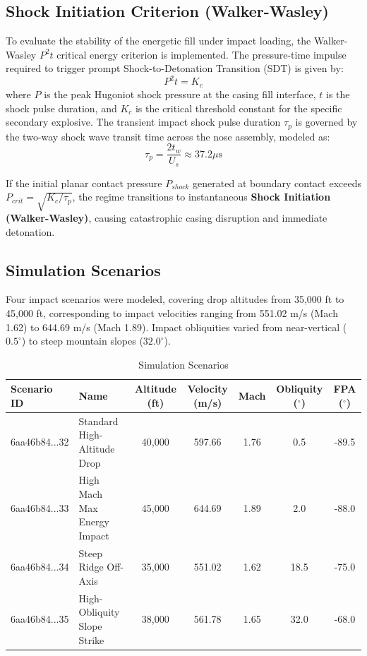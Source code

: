 \documentclass[11pt,a4paper]{article}
\begin{document}
\subsection{Shock Initiation Criterion (Walker-Wasley)}
To evaluate the stability of the energetic fill under impact loading, the Walker-Wasley $P^2 t$ critical energy criterion is implemented. The pressure-time impulse required to trigger prompt Shock-to-Detonation Transition (SDT) is given by:
\begin{equation}
P^2 t = K_c
\end{equation}
where $P$ is the peak Hugoniot shock pressure at the casing fill interface, $t$ is the shock pulse duration, and $K_c$ is the critical threshold constant for the specific secondary explosive. The transient impact shock pulse duration $\tau_p$ is governed by the two-way shock wave transit time across the nose assembly, modeled as:
\begin{equation}
\tau_p = \frac{2 t_w}{U_s} \approx 37.2\mu\text{s}
\end{equation}

If the initial planar contact pressure $P_{shock}$ generated at boundary contact exceeds $P_{crit} = \sqrt{K_c / \tau_p}$, the regime transitions to instantaneous \textbf{Shock Initiation (Walker-Wasley)}, causing catastrophic casing disruption and immediate detonation.

\subsection{Simulation Scenarios}
Four impact scenarios were modeled, covering drop altitudes from 35,000 ft to 45,000 ft, corresponding to impact velocities ranging from 551.02 m/s (Mach 1.62) to 644.69 m/s (Mach 1.89). Impact obliquities varied from near-vertical ($0.5^\circ$) to steep mountain slopes ($32.0^\circ$).

\begin{table}[h]
\centering
\begin{tabular}{llccccc}
\toprule
Scenario ID & Name & Altitude (ft) & Velocity (m/s) & Mach & Obliquity ($^\circ$) & FPA ($^\circ$) \\
\midrule
6aa46b84...32 & Standard High-Altitude Drop & 40,000 & 597.66 & 1.76 & 0.5 & -89.5 \\
6aa46b84...33 & High Mach Max Energy Impact & 45,000 & 644.69 & 1.89 & 2.0 & -88.0 \\
6aa46b84...34 & Steep Ridge Off-Axis & 35,000 & 551.02 & 1.62 & 18.5 & -75.0 \\
6aa46b84...35 & High-Obliquity Slope Strike & 38,000 & 561.78 & 1.65 & 32.0 & -68.0 \\
\bottomrule
\end{tabular}
\caption{Simulation Scenarios}
\end{table}
\end{document}
